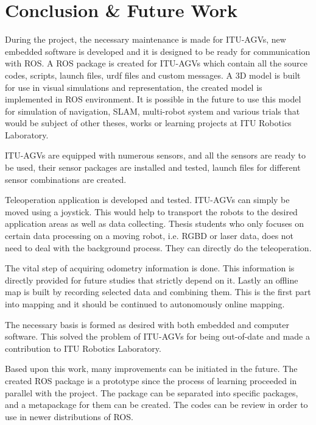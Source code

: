 
\chapter{Conclusion \& Future Work}
\label{chap:conclusion}
During the project, the necessary maintenance is made for ITU-AGVs, new embedded software is developed and it is designed to be ready for communication with ROS. A ROS package is created for ITU-AGVs which contain all the source codes, scripts, launch files, urdf files and custom messages. A 3D model is built for use in visual simulations and representation, the created model is implemented in ROS environment. It is possible in the future to use this model for simulation of navigation, SLAM, multi-robot system and various trials that would be subject of other theses, works or learning projects at ITU Robotics Laboratory. 
\par
ITU-AGVs are equipped with numerous sensors, and all the sensors are ready to be used, their sensor packages are installed and tested, launch files for different sensor combinations are created. 
\par
Teleoperation application is developed and tested. ITU-AGVs can simply be moved using a joystick. This would help to transport the robots to the desired application areas as well as data collecting. Thesis students who only focuses on certain data processing on a moving robot, i.e. RGBD or laser data, does not need to deal with the background process. They can directly do the teleoperation. 
\par
The vital step of acquiring odometry information is done. This information is directly provided for future studies that strictly depend on it. 
Lastly an offline map is built by recording selected data and combining them. This is the first part into mapping and it should be continued to autonomously online mapping. 
\par
The necessary basis is formed as desired with both embedded and computer software. This solved the problem of ITU-AGVs for being out-of-date and made a contribution to ITU Robotics Laboratory. 
\par
Based upon this work, many improvements can be initiated in the future. The created ROS package is a prototype since the process of learning proceeded in parallel with the project. The package can be separated into specific packages, and a metapackage for them can be created. The codes can be review in order to use in newer distributions of ROS. 

